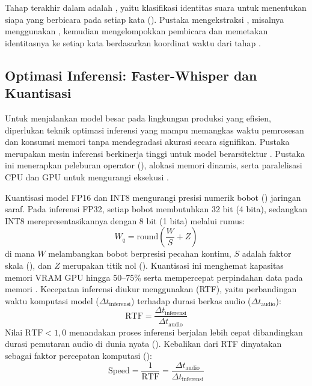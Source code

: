 Tahap terakhir dalam   adalah , yaitu klasifikasi identitas suara untuk menentukan siapa yang berbicara pada setiap kata (). Pustaka  mengekstraksi , misalnya menggunakan , kemudian mengelompokkan pembicara dan memetakan identitasnya ke setiap kata berdasarkan koordinat waktu dari tahap .
\subsection{Optimasi Inferensi: Faster-Whisper dan Kuantisasi}
Untuk menjalankan model besar pada lingkungan produksi yang efisien, diperlukan teknik optimasi inferensi yang mampu memangkas waktu pemrosesan dan konsumsi memori tanpa mendegradasi akurasi secara signifikan.
Pustaka  merupakan mesin inferensi berkinerja tinggi untuk model berarsitektur . Pustaka ini menerapkan peleburan operator (), alokasi memori dinamis, serta paralelisasi CPU dan GPU untuk mengurangi  eksekusi .

Kuantisasi model FP16 dan INT8 mengurangi presisi numerik bobot () jaringan saraf. Pada inferensi FP32, setiap bobot membutuhkan 32 bit (4 bita), sedangkan INT8 merepresentasikannya dengan 8 bit (1 bita) melalui rumus:
    \begin{equation}
        W_q = \text{round}\left(\frac{W}{S} + Z\right)
    \end{equation}
    di mana $W$ melambangkan bobot berpresisi pecahan kontinu, $S$ adalah faktor skala (), dan $Z$ merupakan titik nol (). Kuantisasi ini menghemat kapasitas memori VRAM GPU hingga 50--75\% serta mempercepat perpindahan data pada memori .
Kecepatan inferensi diukur menggunakan  (RTF), yaitu perbandingan waktu komputasi model ($\Delta t_{\text{inferensi}}$) terhadap durasi berkas audio ($\Delta t_{\text{audio}}$):
    \begin{equation}
        \text{RTF} = \frac{\Delta t_{\text{inferensi}}}{\Delta t_{\text{audio}}}
    \end{equation}
    Nilai $\text{RTF} < 1{,}0$ menandakan proses inferensi berjalan lebih cepat dibandingkan durasi pemutaran audio di dunia nyata (). Kebalikan dari RTF dinyatakan sebagai faktor percepatan komputasi ():
    \begin{equation}
        \text{Speed} = \frac{1}{\text{RTF}} = \frac{\Delta t_{\text{audio}}}{\Delta t_{\text{inferensi}}}
    \end{equation}
